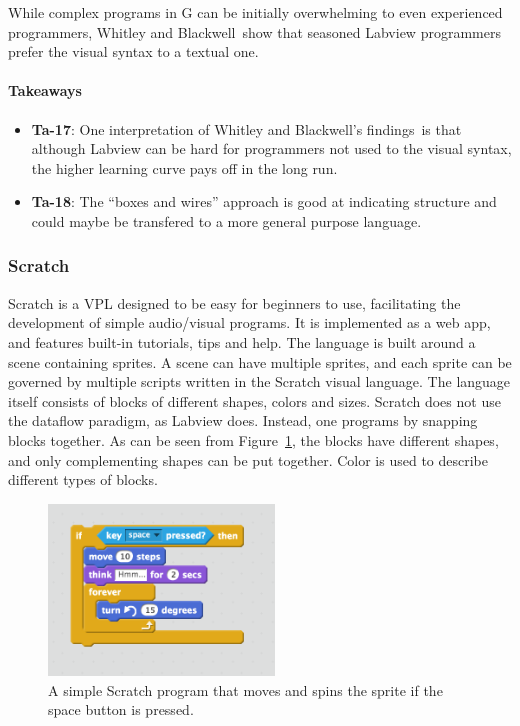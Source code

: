 While complex programs in G can be initially overwhelming to even experienced programmers, Whitley and Blackwell\,\cite{WHITLEY2001435} show that seasoned Labview programmers prefer the visual syntax to a textual one.

\paragraph{Takeaways}
\begin{itemize}
	\item \textbf{Ta-17}: One interpretation of Whitley and Blackwell's findings\,\cite{WHITLEY2001435} is that although Labview can be hard for programmers not used to the visual syntax, the higher learning curve pays off in the long run.
	\item \textbf{Ta-18}: The ``boxes and wires'' approach is good at indicating structure and could maybe be transfered to a more general purpose language.
\end{itemize}


\subsubsection{Scratch}
\label{subsub:Scratch}
Scratch is a VPL designed to be easy for beginners to use, facilitating the development of simple audio/visual programs. It is implemented as a web app, and features built-in tutorials, tips and help.
The language is built around a scene containing sprites. A scene can have multiple sprites, and each sprite can be governed by multiple scripts written in the Scratch visual language. The language itself consists of blocks of different shapes, colors and sizes. Scratch does not use the dataflow paradigm, as Labview does. Instead, one programs by snapping blocks together. As can be seen from Figure~\ref{fig:ScratchProgram}, the blocks have different shapes, and only complementing shapes can be put together. Color is used to describe different types of blocks.

\begin{figure}
	\centering
		\includegraphics[width=60mm]{diagrams/ScratchProgram.png}
	\caption{A simple Scratch program that moves and spins the sprite if the space button is pressed.}
\label{fig:ScratchProgram}
\end{figure}


